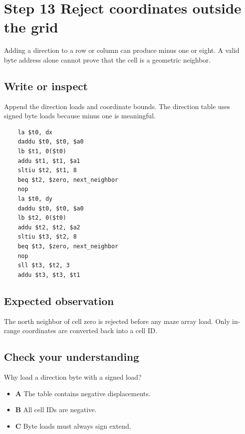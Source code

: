 \section{Step 13 Reject coordinates outside the grid}\label{maze-s13}

Adding a direction to a row or column can produce minus one or eight. A valid byte address alone cannot prove that the cell is a geometric neighbor.

\subsection{Write or inspect}

Append the direction loads and coordinate bounds. The direction table uses signed byte loads because minus one is meaningful.

\begin{verbatim}
    la $t0, dx
    daddu $t0, $t0, $a0
    lb $t1, 0($t0)
    addu $t1, $t1, $a1
    sltiu $t2, $t1, 8
    beq $t2, $zero, next_neighbor
    nop
    la $t0, dy
    daddu $t0, $t0, $a0
    lb $t2, 0($t0)
    addu $t2, $t2, $a2
    sltiu $t3, $t2, 8
    beq $t3, $zero, next_neighbor
    nop
    sll $t3, $t2, 3
    addu $t3, $t3, $t1
\end{verbatim}

\subsection{Expected observation}

The north neighbor of cell zero is rejected before any maze array load. Only in-range coordinates are converted back into a cell ID.

\subsection{Check your understanding}

Why load a direction byte with a signed load?

\begin{itemize}
  \item \textbf{A} The table contains negative displacements.
  \item \textbf{B} All cell IDs are negative.
  \item \textbf{C} Byte loads must always sign extend.
\end{itemize}
